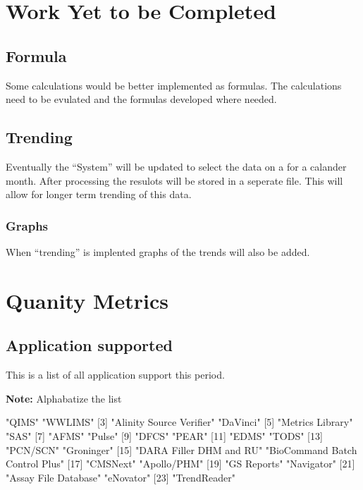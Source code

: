 \documentclass{article}
\begin{document}
\section{Work Yet to be Completed}
\subsection{Formula}
Some calculations would be better implemented as formulas. The calculations need
to be evulated and the formulas developed where needed.
\subsection{Trending}
Eventually the ``System'' will be updated to select the data on a for a calander
month. After processing the resulots will be stored in a seperate file.
This will allow for longer term trending of this data.
\subsubsection{Graphs}
When ``trending'' is implented graphs of the trends will also be added.


\section{Quanity Metrics}
\subsection{Application supported}
This is a list of all application support this period.

\textbf{Note:} Alphabatize the list

\begin{Schunk}
\begin{Soutput}
 [1] "QIMS"                          "WWLIMS"                       
 [3] "Alinity Source Verifier"       "DaVinci"                      
 [5] "Metrics Library"               "SAS"                          
 [7] "AFMS"                          "Pulse"                        
 [9] "DFCS"                          "PEAR"                         
[11] "EDMS"                          "TODS"                         
[13] "PCN/SCN"                       "Groninger"                    
[15] "DARA Filler DHM and RU"        "BioCommand Batch Control Plus"
[17] "CMSNext"                       "Apollo/PHM"                   
[19] "GS Reports"                    "Navigator"                    
[21] "Assay File Database"           "eNovator"                     
[23] "TrendReader"                  
\end{Soutput}
\end{Schunk}
\end{document}
